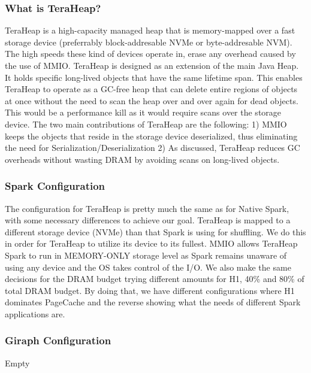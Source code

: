 \subsubsection{What is TeraHeap?}
TeraHeap is a high-capacity managed heap that is memory-mapped over a
fast storage device (preferrably block-addresable NVMe or
byte-addresable NVM). The high speeds these kind of devices operate
in, erase any overhead caused by the use of MMIO. TeraHeap is designed
as an extension of the main Java Heap. It holds specific long-lived
objects that have the same lifetime span. This enables TeraHeap to
operate as a GC-free heap that can delete entire regions of objects at
once without the need to scan the heap over and over again for dead
objects. This would be a performance kill as it would require scans
over the storage device. The two main contributions of TeraHeap are
the following: 1) MMIO keeps the objects that reside in the storage
device deserialized, thus eliminating the need for
Serialization/Deserialization 2) As discussed, TeraHeap reduces GC overheads
without wasting DRAM by avoiding scans on long-lived objects.

\subsubsection{Spark Configuration}
The configuration for TeraHeap is pretty much the same as for Native
Spark, with some necessary differences to achieve our goal. TeraHeap
is mapped to a different storage device (NVMe) than that Spark is
using for shuffling. We do this in order for TeraHeap to utilize its
device to its fullest. MMIO allows TeraHeap Spark to run in
MEMORY-ONLY storage level as Spark remains unaware of using any device and
the OS takes control of the I/O. We also make the same decisions for
the DRAM budget trying different amounts for H1, 40\% and 80\% of
total DRAM budget. By doing that, we have different configurations
where H1 dominates PageCache and the reverse showing what the needs of
different Spark applications are. 

\subsubsection{Giraph Configuration}
Empty

